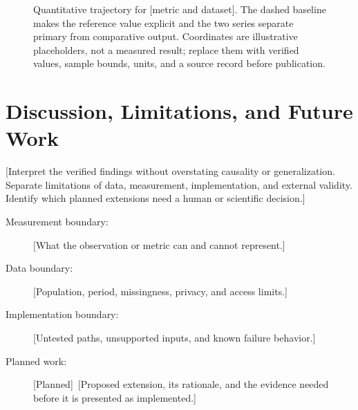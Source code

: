 \documentclass[10pt,a4paper]{article}
\newcommand{\statusplanned}{[Planned]}
\begin{document}
\begin{figure}[htbp]
  \centering
  \caption{Quantitative trajectory for [metric and dataset]. The
    dashed baseline
    makes the reference value explicit and the two series separate primary from
    comparative output. Coordinates are illustrative placeholders, not a
    measured result; replace them with verified values, sample
    bounds, units, and
  a source record before publication.}
  \label{fig:results}
\end{figure}

\section{Discussion, Limitations, and Future Work}
[Interpret the verified findings without overstating causality or
  generalization. Separate limitations of data, measurement, implementation,
  and external validity. Identify which planned extensions need a human or
scientific decision.]

\begin{description}
  \item[Measurement boundary:] [What the observation or metric can and cannot
    represent.]
  \item[Data boundary:] [Population, period, missingness, privacy, and access
    limits.]
  \item[Implementation boundary:] [Untested paths, unsupported inputs, and
    known failure behavior.]
  \item[Planned work:] \statusplanned\ [Proposed extension, its rationale,
    and the evidence needed before it is presented as implemented.]
\end{description}
\end{document}
